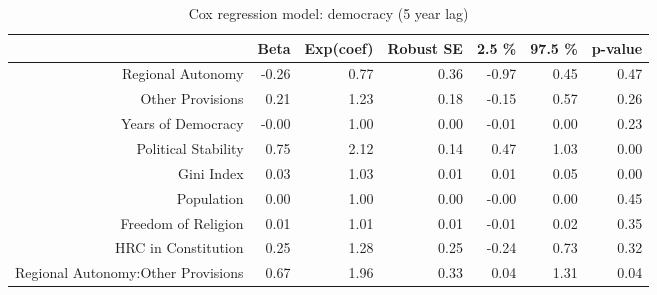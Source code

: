 \begin{table}[ht]
\centering
\begin{tabular}{rrrrrrr}
  \hline
 & Beta & Exp(coef) & Robust SE & 2.5 \% & 97.5 \% & p-value \\ 
  \hline
Regional Autonomy & -0.26 & 0.77 & 0.36 & -0.97 & 0.45 & 0.47 \\ 
  Other Provisions & 0.21 & 1.23 & 0.18 & -0.15 & 0.57 & 0.26 \\ 
  Years of Democracy & -0.00 & 1.00 & 0.00 & -0.01 & 0.00 & 0.23 \\ 
  Political Stability & 0.75 & 2.12 & 0.14 & 0.47 & 1.03 & 0.00 \\ 
  Gini Index & 0.03 & 1.03 & 0.01 & 0.01 & 0.05 & 0.00 \\ 
  Population & 0.00 & 1.00 & 0.00 & -0.00 & 0.00 & 0.45 \\ 
  Freedom of Religion & 0.01 & 1.01 & 0.01 & -0.01 & 0.02 & 0.35 \\ 
  HRC in Constitution & 0.25 & 1.28 & 0.25 & -0.24 & 0.73 & 0.32 \\ 
  Regional Autonomy:Other Provisions & 0.67 & 1.96 & 0.33 & 0.04 & 1.31 & 0.04 \\ 
   \hline
\end{tabular}
\caption{Cox regression model: democracy (5 year lag)} 
\end{table}
